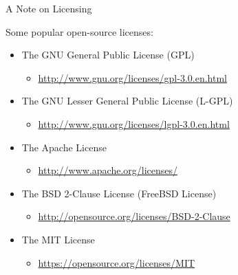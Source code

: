 \documentclass[10pt]{beamer}
\begin{document}
\begin{frame}{A Note on Licensing}

  Some popular open-source licenses:
  \vb
  \begin{itemize}
  \item The GNU General Public License (GPL)
    \begin{itemize}
    \item \url{http://www.gnu.org/licenses/gpl-3.0.en.html}
    \end{itemize}
    \vc
  \item The GNU Lesser General Public License (L-GPL)
    \begin{itemize}
    \item \url{http://www.gnu.org/licenses/lgpl-3.0.en.html}
    \end{itemize}
    \vc
  \item The Apache License
    \begin{itemize}
    \item \url{http://www.apache.org/licenses/}
    \end{itemize}
    \vc
  \item The BSD 2-Clause License (FreeBSD License)
    \begin{itemize}
    \item \url{http://opensource.org/licenses/BSD-2-Clause}
    \end{itemize}
    \vc
  \item The MIT License
    \begin{itemize}
    \item \url{https://opensource.org/licenses/MIT}
    \end{itemize}
  \end{itemize}

\end{frame}

\end{document}
